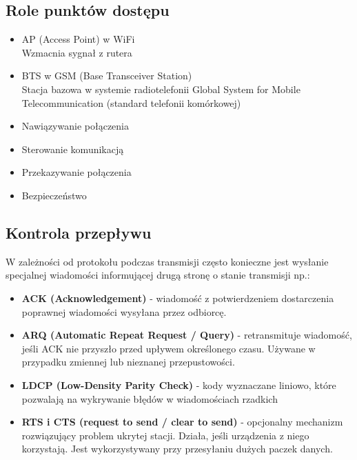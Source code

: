 \documentclass[]{article}
\begin{document}
\subsection{Role punktów dostępu}
\begin{itemize}
    \item AP (Access Point) w WiFi \\
    Wzmacnia sygnał z rutera
    \item BTS w GSM (Base Transceiver Station) \\
    Stacja bazowa w systemie radiotelefonii Global System for Mobile Telecommunication (standard telefonii komórkowej)
    \item Nawiązywanie połączenia
    \item Sterowanie komunikacją
    \item Przekazywanie połączenia
    \item Bezpieczeństwo
\end{itemize}

\subsection{Kontrola przepływu}
W zależności od protokołu podczas transmisji często konieczne jest wysłanie specjalnej wiadomości informującej drugą stronę o stanie transmisji np.:
\begin{itemize}
\item \textbf{ACK (Acknowledgement)} - wiadomość z potwierdzeniem dostarczenia poprawnej wiadomości wysyłana przez odbiorcę.
\item \textbf{ARQ (Automatic Repeat Request / Query)} - retransmituje wiadomość, jeśli ACK nie przyszło przed upływem określonego czasu. Używane w przypadku zmiennej lub nieznanej przepustowości.
\item\textbf{LDCP (Low-Density Parity Check)} - kody wyznaczane liniowo, które pozwalają na wykrywanie błędów w wiadomościach rzadkich
\item \textbf{RTS i CTS (request to send / clear to send)} - opcjonalny mechanizm rozwiązujący problem ukrytej stacji. Działa, jeśli urządzenia z niego korzystają. Jest wykorzystywany przy przesyłaniu dużych paczek danych.
\end{itemize}
\end{document}
